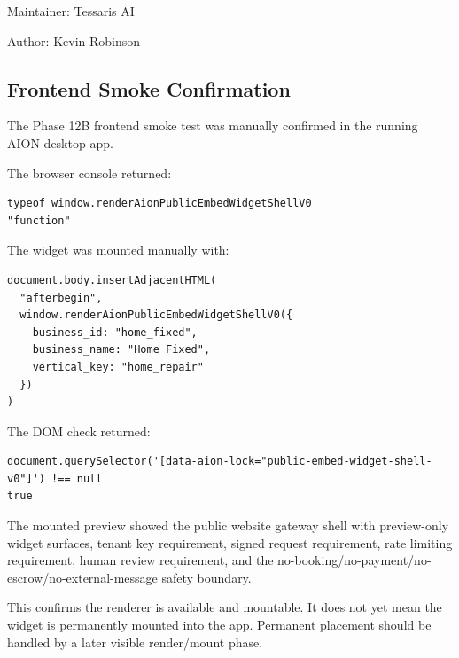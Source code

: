 Maintainer: Tessaris AI

Author: Kevin Robinson


\subsection{Frontend Smoke Confirmation}

The Phase 12B frontend smoke test was manually confirmed in the running AION desktop app.

The browser console returned:

\begin{verbatim}
typeof window.renderAionPublicEmbedWidgetShellV0
"function"
\end{verbatim}

The widget was mounted manually with:

\begin{verbatim}
document.body.insertAdjacentHTML(
  "afterbegin",
  window.renderAionPublicEmbedWidgetShellV0({
    business_id: "home_fixed",
    business_name: "Home Fixed",
    vertical_key: "home_repair"
  })
)
\end{verbatim}

The DOM check returned:

\begin{verbatim}
document.querySelector('[data-aion-lock="public-embed-widget-shell-v0"]') !== null
true
\end{verbatim}

The mounted preview showed the public website gateway shell with preview-only widget surfaces, tenant key requirement, signed request requirement, rate limiting requirement, human review requirement, and the no-booking/no-payment/no-escrow/no-external-message safety boundary.

This confirms the renderer is available and mountable. It does not yet mean the widget is permanently mounted into the app. Permanent placement should be handled by a later visible render/mount phase.
